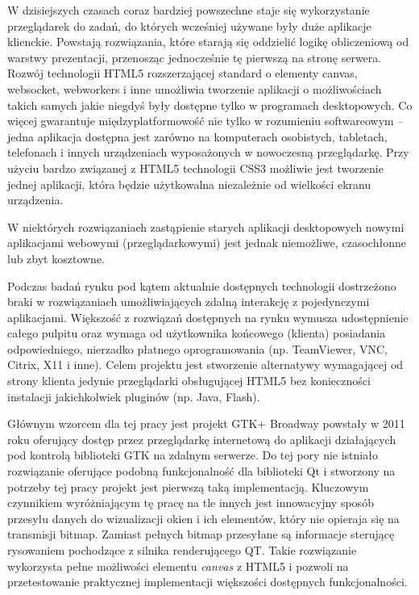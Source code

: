 
W dzisiejszych czasach coraz bardziej powszechne staje się wykorzystanie przeglądarek do zadań, do których wcześniej używane były duże aplikacje klienckie. Powstają rozwiązania, które starają się oddzielić logikę obliczeniową od warstwy prezentacji, przenosząc jednocześnie tę pierwszą na stronę serwera. Rozwój technologii HTML5 rozszerzającej standard o elementy canvas, websocket, webworkers i inne umożliwia tworzenie aplikacji o możliwościach takich samych jakie niegdyś były dostępne tylko w programach desktopowych. Co więcej gwarantuje międzyplatformowość nie tylko w rozumieniu softwareowym -- jedna aplikacja dostępna jest zarówno na komputerach osobistych, tabletach, telefonach i innych urządzeniach wyposażonych w nowoczesną przeglądarkę. Przy użyciu bardzo związanej z HTML5 technologii CSS3 możliwie jest tworzenie jednej aplikacji, która będzie użytkowalna niezależnie od wielkości ekranu urządzenia.\cite{responsive}

W niektórych rozwiązaniach zastąpienie starych aplikacji desktopowych nowymi aplikacjami webowymi (przeglądarkowymi) jest jednak niemożliwe, czasochłonne lub zbyt kosztowne.

Podczas badań rynku pod kątem aktualnie dostępnych technologii dostrzeżono braki w rozwiązaniach umożliwiających zdalną interakcję z pojedynczymi aplikacjami. Większość z rozwiązań dostępnych na rynku wymusza udostępnienie całego pulpitu oraz wymaga od użytkownika końcowego (klienta) posiadania odpowiedniego, nierzadko płatnego oprogramowania (np. TeamViewer, VNC, Citrix, X11 i inne). Celem projektu jest stworzenie alternatywy wymagającej od strony klienta jedynie przeglądarki obsługującej HTML5 bez konieczności instalacji jakichkolwiek pluginów (np. Java, Flash).

Głównym wzorcem dla tej pracy jest projekt GTK+ Broadway powstały w 2011 roku oferujący dostęp przez przeglądarkę internetową do aplikacji działających pod kontrolą biblioteki GTK na zdalnym serwerze. Do tej pory nie istniało rozwiązanie oferujące podobną funkcjonalność dla biblioteki Qt i stworzony na potrzeby tej pracy projekt jest pierwszą taką implementacją. Kluczowym czynnikiem wyróżniającym tę pracę na tle innych jest innowacyjny sposób przesyłu danych do wizualizacji okien i ich elementów, który nie opieraja się na transmisji bitmap. Zamiast pełnych bitmap przesyłane są informacje sterującę rysowaniem pochodzące z silnika renderującego QT.
Takie rozwiązanie wykorzysta pełne możliwości elementu \emph{canvas} z HTML5 i pozwoli na przetestowanie praktycznej implementacji większości dostępnych funkcjonalności.

